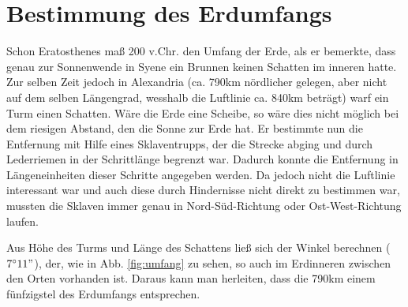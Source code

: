 \documentclass[12pt,a4paper,titlepage,headinclude,bibtotoc]{scrartcl}
\begin{document}
\section{Bestimmung des Erdumfangs}
Schon Eratosthenes maß 200 v.Chr. den Umfang der Erde, als er bemerkte, dass genau zur Sonnenwende in Syene ein Brunnen keinen Schatten im inneren hatte.
Zur selben Zeit jedoch in Alexandria (ca. 790km nördlicher gelegen, aber nicht auf dem selben Längengrad, wesshalb die Luftlinie ca. 840km beträgt) warf ein Turm einen Schatten.
Wäre die Erde eine Scheibe, so wäre dies nicht möglich bei dem riesigen Abstand, den die Sonne zur Erde hat.
Er bestimmte nun die Entfernung mit Hilfe eines Sklaventrupps, der die Strecke abging und durch Lederriemen in der Schrittlänge begrenzt war.
Dadurch konnte die Entfernung in Längeneinheiten dieser Schritte angegeben werden.
Da jedoch nicht die Luftlinie interessant war und auch diese durch Hindernisse nicht direkt zu bestimmen war, mussten die Sklaven immer genau in Nord-Süd-Richtung oder Ost-West-Richtung laufen.

Aus Höhe des Turms und Länge des Schattens ließ sich der Winkel berechnen ($7^\circ11"$), der, wie in Abb. \ref{fig:umfang} zu sehen, so auch im Erdinneren zwischen den Orten vorhanden ist.
Daraus kann man herleiten, dass die 790km einem fünfzigstel des Erdumfangs entsprechen.











\end{document}
